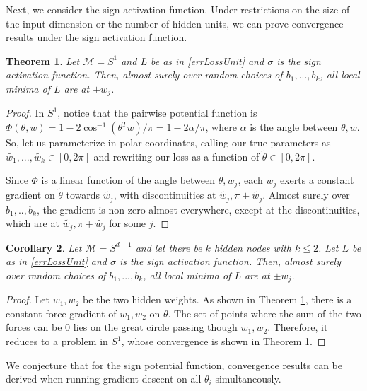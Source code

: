 \documentclass{article}
\newtheorem{theorem}{Theorem}[section]
\newtheorem{corollary}[theorem]{Corollary}
\begin{document}
Next, we consider the sign activation function. Under restrictions on the size of the input dimension or the number of hidden units, we can prove convergence results under the sign activation function. 

\begin{theorem}
\label{SignConv}
Let $\mathcal{M} = S^1$ and $L$ be as in \eqref{errLossUnit} and $\sigma$ is the sign activation function. Then, almost surely over random choices of $b_1,...,b_k$, all local minima of $L$ are at $\pm w_j$.
\end{theorem}

\begin{proof}
In $S^1$, notice that the pairwise potential function is $\Phi(\theta,w) = 1 - 2\cos^{-1}(\theta^Tw)/\pi = 1 - 2\alpha/\pi$, where $\alpha$ is the angle between $\theta, w$. So, let us parameterize in polar coordinates, calling our true parameters as $\widetilde{w_1},...,\widetilde{w_k} \in [0,2\pi]$ and rewriting our loss as a function of $\widetilde{\theta} \in [0,2\pi]$. 

Since $\Phi$ is a linear function of the angle between $\theta, w_j$, each $w_j$ exerts a constant gradient on $\widetilde{\theta}$ towards $\widetilde{w_j}$, with discontinuities at $\widetilde{w_j},\pi+\widetilde{w_j}$. Almost surely over $b_1,..,b_k$, the gradient is non-zero almost everywhere, except at the discontinuities, which are at $\widetilde{w_j}, \pi+\widetilde{w_j}$ for some $j$. 
\end{proof}


\begin{corollary}
\label{SignConv2}
Let $\mathcal{M} = S^{d-1}$ and let there be $k$ hidden nodes with $k\leq 2$. Let $L$ be as in \eqref{errLossUnit} and $\sigma$ is the sign activation function. Then, almost surely over random choices of $b_1,...,b_k$, all local minima of $L$ are at $\pm w_j$.
\end{corollary}

\begin{proof}
Let $w_1,w_2$ be the two hidden weights. As shown in Theorem \ref{SignConv}, there is a constant force gradient
of $w_1, w_2$ on $\theta$. The set of points where the sum of the two forces can be 0 lies on the great circle passing though $w_1,w_2$. Therefore, it reduces to a problem in $S^1$, whose convergence is shown in Theorem \ref{SignConv}.
\end{proof}

We conjecture that for the sign potential function, convergence results can be derived when running gradient descent on all $\theta_i$ simultaneously.
\end{document}
